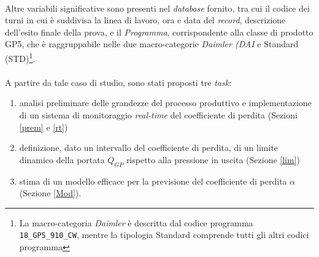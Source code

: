 \documentclass[fleqn,10pt]{SelfArx} %
\begin{document}
\\
Altre variabili significative sono presenti nel \textit{database} fornito, tra cui il codice dei turni in cui è suddivisa la linea di lavoro, ora e data del \textit{record}, descrizione dell'esito finale della prova, e il \textit{Programma}, corrispondente alla classe di prodotto GP5, che è raggruppabile nelle due macro-categorie \textit{Daimler (DAI} e Standard (STD)\footnote{La macro-categoria \textit{Daimler} è descritta dal codice programma \texttt{18\_GP5\_910\_CW}, mentre la tipologia Standard comprende tutti gli altri codici programma}.\\
\\
A partire da tale caso di studio, sono stati proposti tre \textit{task}:
\begin{enumerate}
    \item analisi preliminare delle grandezze del processo produttivo e implementazione di un sistema di monitoraggio \textit{real-time} del coefficiente di perdita (Sezioni \ref{prem} e \ref{rt})
    \item definizione, dato un intervallo del coefficiente di perdita, di un limite dinamico della portata $Q_{GP}$ rispetto alla pressione in uscita (Sezione \ref{lim})
    \item stima di un modello efficace per la previsione del coefficiente di perdita $\alpha$ (Sezione \ref{Mod}).
\end{enumerate}
\end{document}
